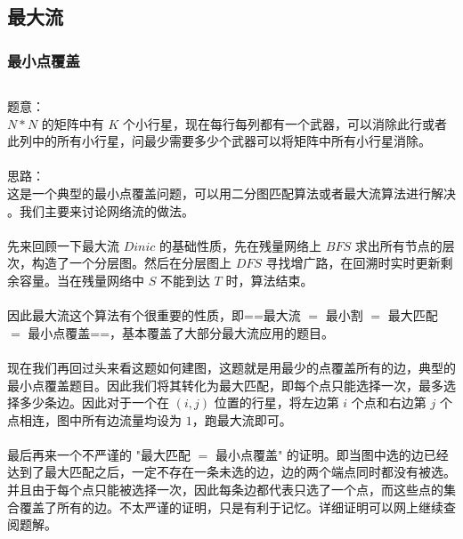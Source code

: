 \documentclass[twoside]{article}
\begin{document}
\subsection{最大流}
\subsubsection{最小点覆盖}
\begin{lstlisting}
\end{lstlisting}
题意：\\
$N*N$ 的矩阵中有 $K$ 个小行星，现在每行每列都有一个武器，可以消除此行或者此列中的所有小行星，问最少需要多少个武器可以将矩阵中所有小行星消除。\\
\\
思路：\\
这是一个典型的最小点覆盖问题，可以用二分图匹配算法或者最大流算法进行解决 。我们主要来讨论网络流的做法。\\
\\
先来回顾一下最大流 $Dinic$ 的基础性质，先在残量网络上 $BFS$ 求出所有节点的层次，构造了一个分层图。然后在分层图上 $DFS$ 寻找增广路，在回溯时实时更新剩余容量。当在残量网络中 $S$ 不能到达 $T$ 时，算法结束。\\
\\
因此最大流这个算法有个很重要的性质，即==最大流 $=$ 最小割 $=$  最大匹配 $=$ 最小点覆盖==，基本覆盖了大部分最大流应用的题目。\\
\\
现在我们再回过头来看这题如何建图，这题就是用最少的点覆盖所有的边，典型的最小点覆盖题目。因此我们将其转化为最大匹配，即每个点只能选择一次，最多选择多少条边。因此对于一个在 $(i,j)$ 位置的行星，将左边第 $i$ 个点和右边第 $j$ 个点相连，图中所有边流量均设为 $1$，跑最大流即可。\\
\\
最后再来一个不严谨的 "最大匹配 $=$ 最小点覆盖" 的证明。即当图中选的边已经达到了最大匹配之后，一定不存在一条未选的边，边的两个端点同时都没有被选。并且由于每个点只能被选择一次，因此每条边都代表只选了一个点，而这些点的集合覆盖了所有的边。不太严谨的证明，只是有利于记忆。详细证明可以网上继续查阅题解。\\
\end{document}
